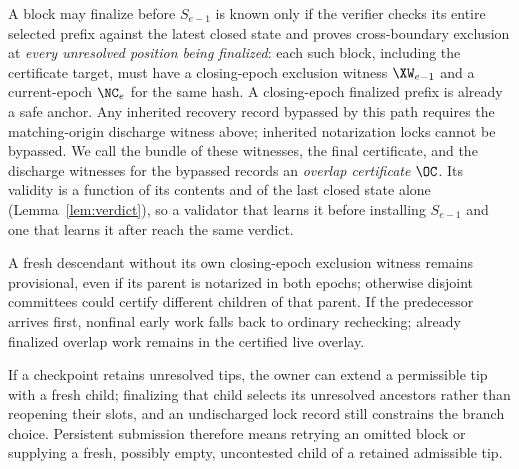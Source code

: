 A block may finalize before $S_{e-1}$ is known only if the verifier checks its entire selected prefix against the latest closed state and proves cross-boundary exclusion at \emph{every unresolved position being finalized}: each such block, including the certificate target, must have a closing-epoch exclusion witness $\XW_{e-1}$ and a current-epoch $\NC_e$ for the same hash. A closing-epoch finalized prefix is already a safe anchor. Any inherited recovery record bypassed by this path requires the matching-origin discharge witness above; inherited notarization locks cannot be bypassed. We call the bundle of these witnesses, the final certificate, and the discharge witnesses for the bypassed records an \emph{overlap certificate} $\OC$. Its validity is a function of its contents and of the last closed state alone (Lemma~\ref{lem:verdict}), so a validator that learns it before installing $S_{e-1}$ and one that learns it after reach the same verdict.

A fresh descendant without its own closing-epoch exclusion witness remains provisional, even if its parent is notarized in both epochs; otherwise disjoint committees could certify different children of that parent. If the predecessor arrives first, nonfinal early work falls back to ordinary rechecking; already finalized overlap work remains in the certified live overlay.

If a checkpoint retains unresolved tips, the owner can extend a permissible tip with a fresh child; finalizing that child selects its unresolved ancestors rather than reopening their slots, and an undischarged lock record still constrains the branch choice. Persistent submission therefore means retrying an omitted block or supplying a fresh, possibly empty, uncontested child of a retained admissible tip.
